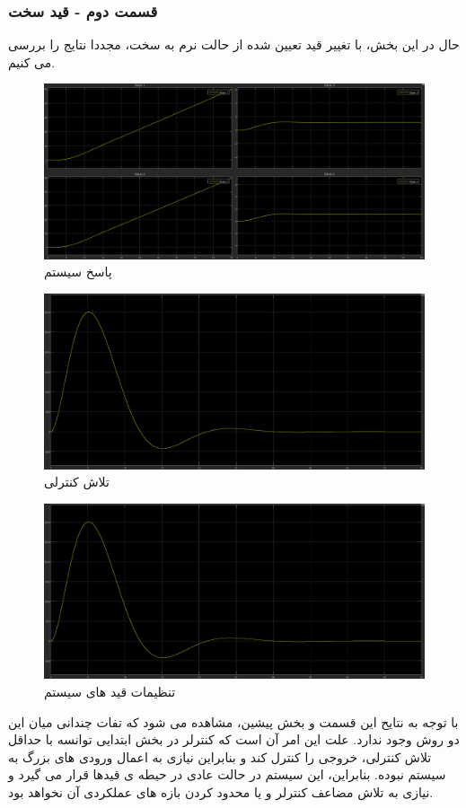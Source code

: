 \subsubsection*{قسمت دوم - قید سخت}
حال در این بخش، با تغییر قید تعیین شده از حالت نرم به سخت، مجددا نتایج را بررسی می کنیم.
\begin{figure}[H]
	\centering
	\includegraphics[width=1\linewidth]{../img/Q2_LMPC_ِHard_Response}
	\caption{پاسخ سیستم}
	\label{fig:q2lmpchardresponse}
\end{figure}
\begin{figure}[H]
	\centering
	\includegraphics[width=0.7\linewidth]{"../img/Q2_LMPC_ِHard_Ceffort"}
	\caption{تلاش کنترلی}
	\label{fig:q2lmpchardceffort}
\end{figure}
\begin{figure}[H]
	\centering
	\includegraphics[width=0.7\linewidth]{"../img/Q2_LMPC_ِHard_Ceffort"}
	\caption{تنظیمات قید های سیستم}
	\label{fig:q2lmpchardsetting}
\end{figure}
با توجه به نتایح این قسمت و بخش پیشین، مشاهده می شود که تفات چندانی میان این دو روش وجود ندارد. علت این امر آن است که کنترلر در بخش ابتدایی توانسه با حداقل تلاش کنترلی، خروجی را کنترل کند و بنابراین نیازی به اعمال ورودی های بزرگ به سیستم نبوده. بنابراین، این سیستم در حالت عادی در حیطه ی قیدها قرار می گیرد و نیازی به تلاش مضاعف کنترلر و یا محدود کردن بازه های عملکردی آن نخواهد بود.
